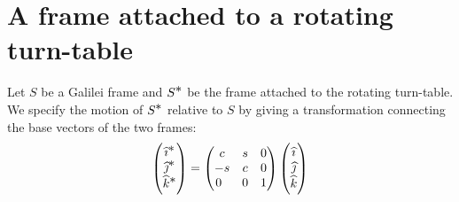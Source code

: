 \section{A frame attached to a rotating  turn-table}
Let $S$ be a Galilei frame and $S^{\textstyle \ast}$ be the frame 
attached to the rotating turn-table. We specify the motion 
of $ S^{\textstyle \ast}$ relative to $S$ by giving a transformation 
connecting the base vectors of the two frames:
\begin{align}\label{nif.42}
\begin{pmatrix}
{\ensuremath{\widehat{\imath}}}^{{\textstyle \ast}}\\ {\widehat{\jmath}}^{{\textstyle \ast}}\\ {\widehat{k}}^{{\textstyle \ast}}
\end{pmatrix}
=\begin{pmatrix}
c & s & 0\\
-s & c& 0 \\
0\;\;&0&1\end{pmatrix} \begin{pmatrix}{\ensuremath{\widehat{\imath}}}\\
{\widehat{\jmath}}\\{\widehat{k}}\end{pmatrix}
\end{align}

\newpage

